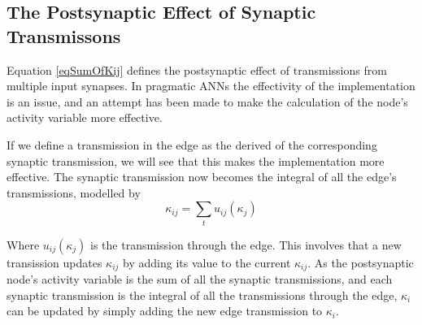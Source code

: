 		

		\subsection{The Postsynaptic Effect of Synaptic Transmissons}
			\label{ssecSynInputToANodeKANN}
			Equation \eqref{eqSumOfKij} defines the postsynaptic effect of transmissions from multiple input synapses.
			In pragmatic ANNs the effectivity of the implementation is an issue, and an attempt has been made to make the calculation of the node's activity variable more effective.
			
			If we define a transmission in the edge as the derived of the corresponding synaptic transmission, we will see that this makes the implementation more effective.
			The synaptic transmission now becomes the integral of all the edge's transmissions, modelled by %
			\begin{equation}
				\kappa_{ij} = \sum_t{u_{ij}(\kappa_j)}
				\label{eqSynapticTransmissionAsSumOfEdgeTransmissions}
			\end{equation}
			
			Where $u_{ij}(\kappa_j)$ is the transmission through the edge.
			This involves that a new transission updates $\kappa_{ij}$ by adding its value to the current $\kappa_{ij}$.
			As the postsynaptic node's activity variable is the sum of all the synaptic transmissions, and each synaptic transmission is the integral of all the transmissions through the edge, 
				$\kappa_i$ can be updated by simply adding the new edge transmission to $\kappa_i$.

